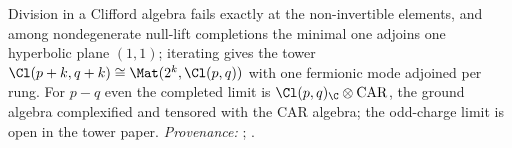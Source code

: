 Division in a Clifford algebra fails exactly at the non-invertible elements, and among nondegenerate null-lift completions the minimal one adjoins one hyperbolic plane $(1,1)$; iterating gives the tower $\Cl(p+k, q+k) \cong \Mat(2^{k}, \Cl(p,q))$ with one fermionic mode adjoined per rung. For $p - q$ even the completed limit is $\Cl(p,q)_{\C} \otimes \mathrm{CAR}$, the ground algebra complexified and tensored with the CAR algebra; the odd-charge limit is open in the tower paper. \emph{Provenance:} \cite[Thm.~4.13]{ButlerT1}; \cite[Thm.~5.6, Question~5.8, Cor.~6.2]{ButlerT3}.
